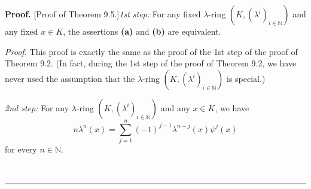 \documentclass[numbers=enddot,12pt,final,onecolumn,notitlepage]{scrartcl}%
\newenvironment{proof}[1][Proof]{\noindent\textbf{#1.} }{\ \rule{0.5em}{0.5em}}
\begin{document}
\begin{proof}
[Proof of Theorem 9.5.]\textit{1st step:} For any fixed $\lambda$-ring
$\left(  K,\left(  \lambda^{i}\right)  _{i\in\mathbb{N}}\right)  $ and any
fixed $x\in K$, the assertions \textbf{(a)} and \textbf{(b)} are equivalent.

\textit{Proof.} This proof is exactly the same as the proof of the 1st step of
the proof of Theorem 9.2. (In fact, during the 1st step of the proof of
Theorem 9.2, we have never used the assumption that the $\lambda$-ring
$\left(  K,\left(  \lambda^{i}\right)  _{i\in\mathbb{N}}\right)  $ is special.)

\textit{2nd step:} For any $\lambda$-ring $\left(  K,\left(  \lambda
^{i}\right)  _{i\in\mathbb{N}}\right)  $ and any $x\in K$, we have%
\[
n\lambda^{n}\left(  x\right)  =\sum_{j=1}^{n}\left(  -1\right)  ^{j-1}%
\lambda^{n-j}\left(  x\right)  \psi^{j}\left(  x\right)
\]
for every $n\in\mathbb{N}$.


\end{proof}
\end{document}
